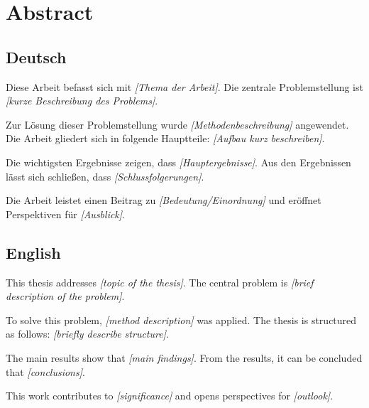 
\chapter*{Abstract}


\section*{Deutsch}

Diese Arbeit befasst sich mit \textit{[Thema der Arbeit]}. Die zentrale Problemstellung ist \textit{[kurze Beschreibung des Problems]}.

Zur Lösung dieser Problemstellung wurde \textit{[Methodenbeschreibung]} angewendet. Die Arbeit gliedert sich in folgende Hauptteile: \textit{[Aufbau kurz beschreiben]}.

Die wichtigsten Ergebnisse zeigen, dass \textit{[Hauptergebnisse]}. Aus den Ergebnissen lässt sich schließen, dass \textit{[Schlussfolgerungen]}.

Die Arbeit leistet einen Beitrag zu \textit{[Bedeutung/Einordnung]} und eröffnet Perspektiven für \textit{[Ausblick]}.

\vspace{1cm}

\section*{English}

This thesis addresses \textit{[topic of the thesis]}. The central problem is \textit{[brief description of the problem]}.

To solve this problem, \textit{[method description]} was applied. The thesis is structured as follows: \textit{[briefly describe structure]}.

The main results show that \textit{[main findings]}. From the results, it can be concluded that \textit{[conclusions]}.

This work contributes to \textit{[significance]} and opens perspectives for \textit{[outlook]}.

